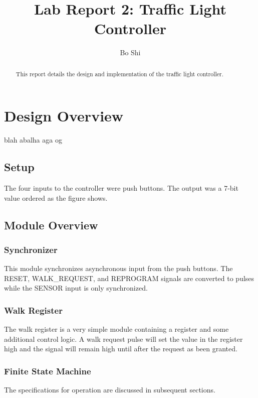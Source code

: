 \documentclass{article}
\author{Bo Shi}
\title{Lab Report 2: Traffic Light Controller}
\begin{document}
\maketitle

\begin{abstract}
This report details the design and implementation of the traffic light controller.
\end{abstract}

\newpage
\tableofcontents

\newpage
\listoffigures 
\listoftables 

\newpage
\section{Design Overview}
	blah abalha aga og

	\subsection{Setup}
		The four inputs to the controller were push buttons.  The
		output was a 7-bit value ordered as the figure shows.
	

	\subsection{Module Overview}
		\subsubsection{Synchronizer}
			This module synchronizes asynchronous input from the
			push buttons.  The RESET, WALK\_REQUEST, and REPROGRAM
			signals are converted to pulses while the SENSOR input
			is only synchronized.

		\subsubsection{Walk Register}
			The walk register is a very simple module containing a
			register and some additional control logic.  A walk
			request pulse will set the value in the register high
			and the signal will remain high until after the request
			as been granted.

		\subsubsection{Finite State Machine}
			The specifications for operation are discussed in
			subsequent sections.
\end{document}
